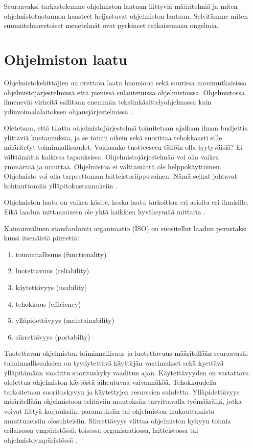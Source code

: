 \documentclass[finnish]{tktltiki2}
\theoremstyle{definition}
\theoremstyle{remark}
\begin{document}
Seuraavaksi tarkastelemme ohjelmiston laatuun liittyviä määritelmiä ja miten ohjelmistotuotannon haasteet heijastuvat ohjelmiston laatuun. Selvitämme miten suunnitelmavetoiset menetelmät ovat pyrkineet ratkaisemaan ongelmia.

\section{Ohjelmiston laatu}

Ohjelmistokehittäjien on otettava laatu huomioon sekä suurissa monimutkaisissa ohjelmistojärjestelmissä että pienissä sulautetuissa ohjelmistoissa. Ohjelmistossa ilmeneviä virheitä sallitaan enemmän tekstinkäsittelyohjelmassa kuin ydinvoimalalaitoksen ohjausjärjestelmissä \cite{KIP96}.

Oletetaan, että tilattu ohjelmistojärjestelmä toimitetaan ajallaan ilman budjettia ylittäviä kustannuksia, ja se toimii oikein sekä suorittaa tehokkaasti sille määritetyt toiminnallisuudet. Voidaanko tuotteeseen tällöin olla tyytyväisiä? Ei välttämättä kaikissa tapauksissa. Ohjelmistojärjestelmää voi olla vaikea ymmärtää ja muuttaa. Ohjelmistoa ei välttämättä ole helppokäyttöinen. Ohjelmisto voi olla tarpeettoman laitteistoriippuvainen. Nämä seikat johtavat kohtuuttomiin ylläpitokustannuksiin \cite{BBL76}.

Ohjelmiston laatu on vaikea käsite, koska laatu tarkoittaa eri asioita eri ihmisille. Eikä laadun mittaamiseen ole yhtä kaikkien hyväksymää mittaria \cite{KIP96}.        

Kansainvälinen standardointi organisaatio (ISO) on suositellut laadun perustaksi kuusi itsenäistä piirrettä:

\begin{enumerate}
  \item toiminnallisuus (functionality)
  \item luotettavuus (reliability)
  \item käytettävyys (usability)
  \item tehokkuus (efficiency)
  \item ylläpidettävyys (maintainability)
  \item siirrettävyys (portabilty) \cite{KIP96}
\end{enumerate}

Tuotettavan ohjelmiston toiminnallisuus ja luotettavuus määritellään seuraavasti: toiminnallisuuksien on tyydytettävä käyttäjän vaatimukset sekä kyettävä ylläpitämään vaadittu suorituskyky vaaditun ajan. Käytettävyyden on vastattava oletettua ohjelmiston käytöstä aiheutuvaa vaivannäköä. Tehokkuudella tarkoitetaan suorituskyvyn ja käytettyjen resurssien suhdetta. Ylläpidettävyys määritellään ohjelmistoon tehtäviin muutoksiin tarvittavalla työmäärällä, jotka voivat liittyä korjauksiin, parannuksiin tai ohjelmiston mukauttamista muuttuneisiin olosuhteisiin. Siirrettävyys viittaa ohjelmiston kykyyn toimia erilaisessa ympäristössä: toisessa organisaatiossa, laitteistossa tai ohjelmistoympäristössä \cite{KIP96}.
\end{document}
